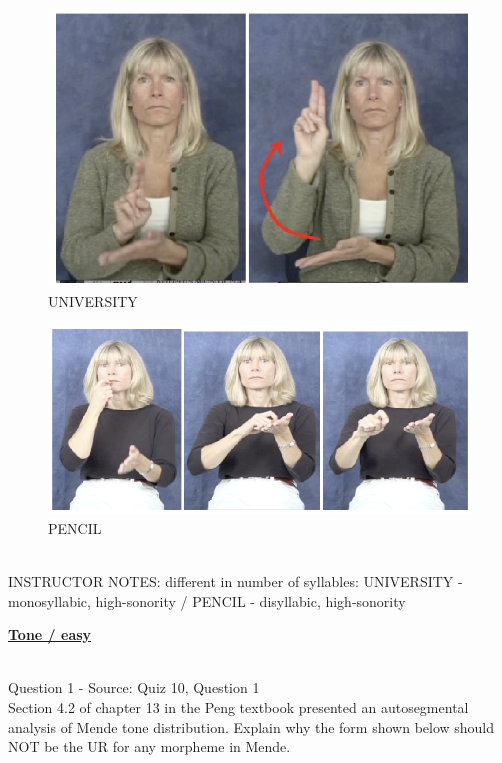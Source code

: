 \documentclass[12pt]{article}
\begin{document}
\begin{figure}[H]
\includegraphics{../images/asl_university.png}
\caption{UNIVERSITY}
\end{figure}
\begin{figure}[H]
\includegraphics{../images/asl_pencil.png}
\caption{PENCIL}
\end{figure}

~\\
INSTRUCTOR NOTES: different in number of syllables: UNIVERSITY - monosyllabic, high-sonority / PENCIL - disyllabic, high-sonority


\newpage\textbf{\underline{\huge Tone / easy\\}}

~\\

{\large Question 1} - Source: Quiz 10, Question 1\\

Section 4.2 of chapter 13 in the Peng textbook presented an autosegmental analysis of Mende tone distribution. Explain why the form shown below should NOT be the UR for any morpheme in Mende.\\
\end{document}
